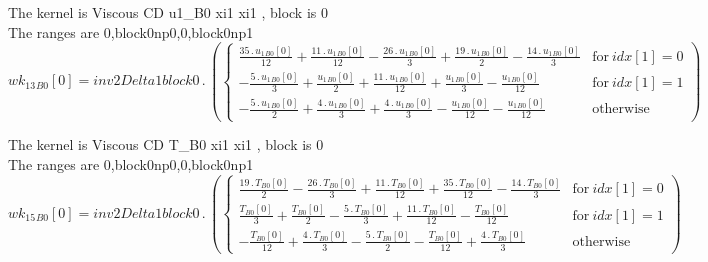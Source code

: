 \documentclass{article}
\begin{document}
\noindent The kernel is Viscous CD u1_B0 xi1 xi1 , block is 0\\\noindent The ranges are 0,block0np0,0,block0np1\\\begin{dmath}{wk_{13}{_{B0}}}[{0}] = inv2Delta1block0 \,.\, \left(\begin{cases} \frac{35 \,.\, {u_{1}{_{B0}}}[{0}]}{12} + \frac{11 \,.\, {u_{1}{_{B0}}}[{0}]}{12} - \frac{26 \,.\, {u_{1}{_{B0}}}[{0}]}{3} + \frac{19 \,.\, {u_{1}{_{B0}}}[{0}]}{2} - 
\frac{14 \,.\, {u_{1}{_{B0}}}[{0}]}{3} & \text{for}\: {idx}[{1}] = 0 \\- \frac{5 \,.\, {u_{1}{_{B0}}}[{0}]}{3} + \frac{{u_{1}{_{B0}}}[{0}]}{2} + \frac{11 \,.\, {u_{1}{_{B0}}}[{0}]}{12} + \frac{{u_{1}{_{B0}}}[{0}]}{3} - \frac{{u_{1}{_{B0}}}[{0}]}{12} 
& \text{for}\: {idx}[{1}] = 1 \\- \frac{5 \,.\, {u_{1}{_{B0}}}[{0}]}{2} + \frac{4 \,.\, {u_{1}{_{B0}}}[{0}]}{3} + \frac{4 \,.\, {u_{1}{_{B0}}}[{0}]}{3} - \frac{{u_{1}{_{B0}}}[{0}]}{12} - \frac{{u_{1}{_{B0}}}[{0}]}{12} & \text{otherwise} 
\end{cases}\right)\end{dmath}

\noindent The kernel is Viscous CD T_B0 xi1 xi1 , block is 0\\\noindent The ranges are 0,block0np0,0,block0np1\\\begin{dmath}{wk_{15}{_{B0}}}[{0}] = inv2Delta1block0 \,.\, \left(\begin{cases} \frac{19 \,.\, {T{_{B0}}}[{0}]}{2} - \frac{26 \,.\, {T{_{B0}}}[{0}]}{3} + \frac{11 \,.\, {T{_{B0}}}[{0}]}{12} + \frac{35 \,.\, {T{_{B0}}}[{0}]}{12} - \frac{14 \,.\, 
{T{_{B0}}}[{0}]}{3} & \text{for}\: {idx}[{1}] = 0 \\\frac{{T{_{B0}}}[{0}]}{3} + \frac{{T{_{B0}}}[{0}]}{2} - \frac{5 \,.\, {T{_{B0}}}[{0}]}{3} + \frac{11 \,.\, {T{_{B0}}}[{0}]}{12} - \frac{{T{_{B0}}}[{0}]}{12} & \text{for}\: {idx}[{1}] = 1 \\- 
\frac{{T{_{B0}}}[{0}]}{12} + \frac{4 \,.\, {T{_{B0}}}[{0}]}{3} - \frac{5 \,.\, {T{_{B0}}}[{0}]}{2} - \frac{{T{_{B0}}}[{0}]}{12} + \frac{4 \,.\, {T{_{B0}}}[{0}]}{3} & \text{otherwise} \end{cases}\right)\end{dmath}
\end{document}
